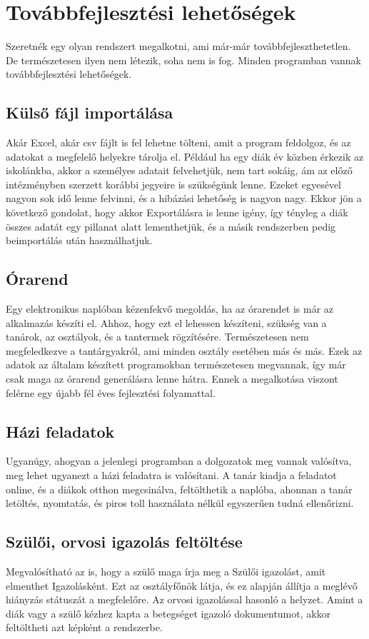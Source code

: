 \documentclass[
]{thesis-ekf}
\begin{document}
\chapter{Továbbfejlesztési lehetőségek}
Szeretnék egy olyan rendszert megalkotni, ami már-már továbbfejleszthetetlen. De természetesen ilyen nem létezik, soha nem is fog. Minden programban vannak továbbfejlesztési lehetőségek.
\section{Külső fájl importálása}
Akár Excel, akár csv fájlt is fel lehetne tölteni, amit a program feldolgoz, és az adatokat a megfelelő helyekre tárolja el. Például ha egy diák év közben érkezik az iskolánkba, akkor a személyes adatait felvehetjük, nem tart sokáig, ám az előző intézményben szerzett korábbi jegyeire is szükségünk lenne. Ezeket egyesével nagyon sok idő lenne felvinni, és a hibázási lehetőség is nagyon nagy. Ekkor jön a következő gondolat, hogy akkor Exportálásra is lenne igény, így tényleg a diák összes adatát egy pillanat alatt lementhetjük, és a másik rendszerben pedig beimportálás után használhatjuk.
\section{Órarend}
Egy elektronikus naplóban kézenfekvő megoldás, ha az órarendet is már az alkalmazás készíti el. Ahhoz, hogy ezt el lehessen készíteni, szükség van a tanárok, az osztályok, és a tantermek rögzítésére. Természetesen nem megfeledkezve a tantárgyakról, ami minden osztály esetében más és más. Ezek az adatok az általam készített programokban természetesen megvannak, így már csak maga az órarend generálásra lenne hátra. Ennek a megalkotása viszont felérne egy újabb fél éves fejlesztési folyamattal.
\section{Házi feladatok}
Ugyanúgy, ahogyan a jelenlegi programban a dolgozatok meg vannak valósítva, meg lehet ugyanezt a házi feladatra is valósítani. A  tanár kiadja a feladatot online, és a diákok otthon megcsinálva, feltölthetik a naplóba, ahonnan a tanár letöltés, nyomtatás, és piros toll használata nélkül egyszerűen tudná ellenőrizni. 
\section{Szülői, orvosi igazolás feltöltése}
Megvalósítható az is, hogy a szülő maga írja meg a Szülői igazolást, amit elmenthet Igazolásként. Ezt az osztályfőnök látja, és ez alapján állítja a meglévő hiányzás státuszát a megfelelőre. Az orvosi igazolással hasonló a helyzet. Amint a diák vagy a szülő kézhez kapta a betegséget igazoló dokumentumot, akkor feltöltheti azt képként a rendszerbe.
\end{document}
